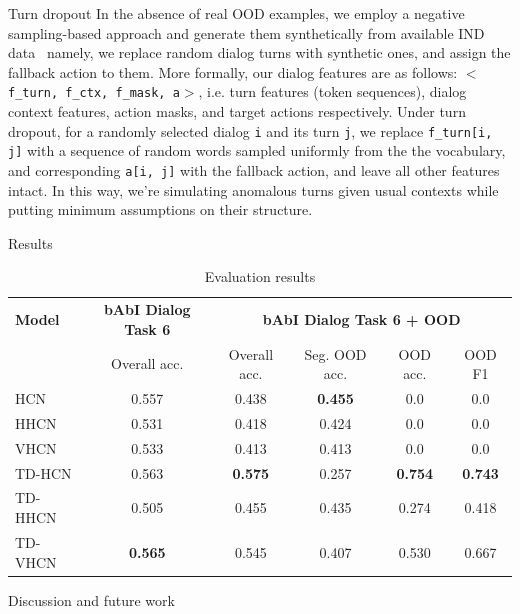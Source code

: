 \documentclass[final]{beamer}
\newlength{\colwidth}
\newlength{\doublecolwidth}
\begin{document}
\begin{frame}[t]
\begin{columns}[t]
\begin{column}{\doublecolwidth}
\begin{columns}[t,totalwidth=\doublecolwidth]
\begin{column}{\colwidth}
\begin{block}{Turn dropout}
In the absence of real OOD examples, we employ a negative sampling-based approach and generate them synthetically from available IND data~\textemdash{} namely, we replace random dialog turns with synthetic ones, and assign the fallback action to them. More formally, our dialog features are as follows: \texttt{$<$f\_turn, f\_ctx, f\_mask, a$>$}, i.e. turn features (token sequences), dialog context features, action masks, and target actions respectively. Under turn dropout, for a randomly selected dialog \texttt{i} and its turn \texttt{j}, we replace \texttt{f\_turn[i, j]} with a sequence of random words sampled uniformly from the the vocabulary, and corresponding \texttt{a[i, j]} with the fallback action, and leave all other features intact. In this way, we're simulating anomalous turns given usual contexts while putting minimum assumptions on their structure.
\end{block}

\begin{alertblock}{Results}
\begin{table}
  \centering
  \small
    \begin{tabular}{|l|c|cccc|}
      \hline
      \textbf{Model}&\textbf{bAbI Dialog Task 6}&\multicolumn{4}{c|}{\textbf{bAbI Dialog Task 6 + OOD}}\\
      &Overall acc.&\multicolumn{1}{c}{Overall acc.}&\multicolumn{1}{c}{Seg. OOD acc.}&\multicolumn{1}{c}{OOD acc.}&OOD F1\\\hline\hline
      HCN&0.557&0.438&\textbf{0.455}&0.0&0.0\\
      HHCN&0.531&0.418&0.424&0.0&0.0\\
      VHCN&0.533&0.413&0.413&0.0&0.0\\\hline
      TD-HCN&0.563&\textbf{0.575}&0.257&\textbf{0.754}&\textbf{0.743}\\
      TD-HHCN&0.505&0.455&0.435&0.274&0.418\\
      TD-VHCN&\textbf{0.565}&0.545&0.407&0.530&0.667\\\hline
    \end{tabular}
    \caption{Evaluation results}
    \label{tab:evaluation}
\end{table}
\end{alertblock}

\begin{block}{Discussion and future work}


\end{block}
\end{column}
\end{columns}
\end{column}
\end{columns}
\end{frame}
\end{document}
